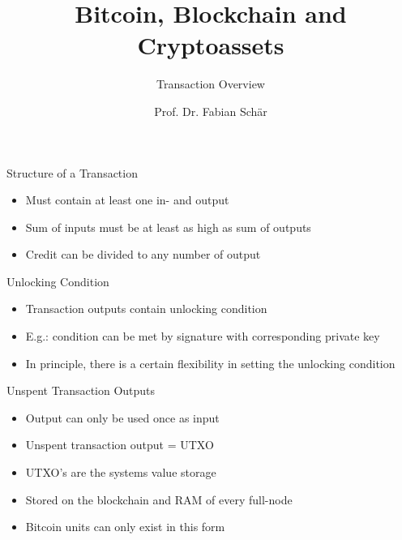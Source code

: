 \documentclass[]{beamer}
\title{Bitcoin, Blockchain and Cryptoassets}
\subtitle{Transaction Overview}
\author{Prof. Dr. Fabian Schär}
\institute{University of Basel}
\begin{document}
\thispagestyle{empty}
\begin{frame}[noframenumbering]
	\titlepage
\end{frame}


\begin{frame}{Structure of a Transaction}
	\centering
	\begin{figure}
	
	\end{figure} 
\vspace{1em}
\begin{itemize}
  	\item<2->{Must contain at least one in- and output}
  	\item<3->{Sum of inputs must be at least as high as sum of outputs}
	\item<4->{Credit can be divided to any number of output}
\end{itemize}
\end{frame}	


\begin{frame}{Unlocking Condition}
\begin{itemize}
    \item<1->{Transaction outputs contain unlocking condition}
    \item<2->{E.g.: condition can be met by signature with corresponding private key}
    \item<3->{In principle, there is a certain flexibility in setting the unlocking condition}
    
\end{itemize}
\end{frame}        


\begin{frame}{Unspent Transaction Outputs}
\begin{itemize}
    \item<1->{Output can only be used once as input}
    \item<2->{Unspent transaction output = UTXO}
    \item<3->{UTXO's are the systems value storage}
    \item<4->{Stored on the blockchain and RAM of every full-node}
    \item<5->{Bitcoin units can only exist in this form}
\end{itemize}    
\end{frame}
\end{document}

